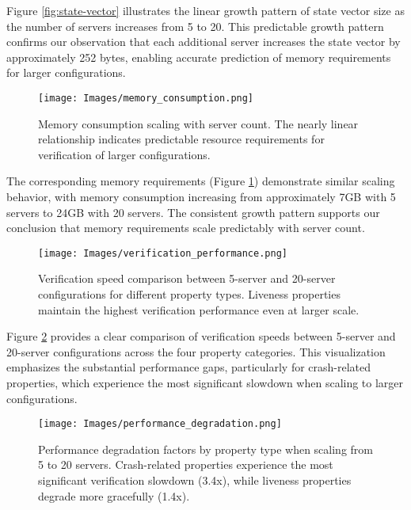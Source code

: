 Figure \ref{fig:state-vector} illustrates the linear growth pattern of state vector size as the number of servers increases from 5 to 20. This predictable growth pattern confirms our observation that each additional server increases the state vector by approximately 252 bytes, enabling accurate prediction of memory requirements for larger configurations.

\begin{figure}[htbp]
    \centering
    \texttt{[image: Images/memory\_consumption.png]}
    \caption{Memory consumption scaling with server count. The nearly linear relationship indicates predictable resource requirements for verification of larger configurations.}
    \label{fig:memory-consumption}
\end{figure}

The corresponding memory requirements (Figure \ref{fig:memory-consumption}) demonstrate similar scaling behavior, with memory consumption increasing from approximately 7GB with 5 servers to 24GB with 20 servers. The consistent growth pattern supports our conclusion that memory requirements scale predictably with server count.

\begin{figure}[htbp]
    \centering
    \texttt{[image: Images/verification\_performance.png]}
    \caption{Verification speed comparison between 5-server and 20-server configurations for different property types. Liveness properties maintain the highest verification performance even at larger scale.}
    \label{fig:verification-performance}
\end{figure}

Figure \ref{fig:verification-performance} provides a clear comparison of verification speeds between 5-server and 20-server configurations across the four property categories. This visualization emphasizes the substantial performance gaps, particularly for crash-related properties, which experience the most significant slowdown when scaling to larger configurations.

\begin{figure}[htbp]
    \centering
    \texttt{[image: Images/performance\_degradation.png]}
    \caption{Performance degradation factors by property type when scaling from 5 to 20 servers. Crash-related properties experience the most significant verification slowdown (3.4x), while liveness properties degrade more gracefully (1.4x).}
    \label{fig:performance-degradation}
\end{figure}

